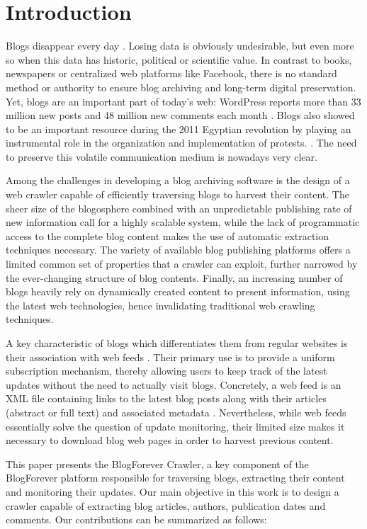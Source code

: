 \section{Introduction}

Blogs disappear every day \cite{johnson2008blogs}. Losing data is obviously undesirable, but even more so when this data has historic, political or scientific value. In contrast to books, newspapers or centralized web platforms like Facebook, there is no standard method or authority to ensure blog archiving and long-term digital preservation. Yet, blogs are an important part of today's web: WordPress reports more than 33 million new posts and 48 million new comments each month \cite{wordpress2014}. Blogs also showed to be an important resource during the 2011 Egyptian revolution by playing an instrumental role in the organization and implementation of protests. \cite{nahedeltantawy2012}. The need to preserve this volatile communication medium is nowadays very clear.

Among the challenges in developing a blog archiving software is the design of a web crawler capable of efficiently traversing blogs to harvest their content. The sheer size of the blogosphere combined with an unpredictable publishing rate of new information call for a highly scalable system, while the lack of programmatic access to the complete blog content makes the use of automatic extraction techniques necessary. The variety of available blog publishing platforms offers a limited common set of properties that a crawler can exploit, further narrowed by the ever-changing structure of blog contents. Finally, an increasing number of blogs heavily rely on dynamically created content to present information, using the latest web technologies, hence invalidating traditional web crawling techniques.

A key characteristic of blogs which differentiates them from regular websites is their association with web feeds \cite{lindahl2003weblogs}. Their primary use is to provide a uniform subscription mechanism, thereby allowing users to keep track of the latest updates without the need to actually visit blogs. Concretely, a web feed is an XML file containing links to the latest blog posts along with their articles (abstract or full text) and associated metadata \cite{board2007rss}. Nevertheless, while web feeds essentially solve the question of update monitoring, their limited size makes it necessary to download blog web pages in order to harvest previous content.

This paper presents the BlogForever Crawler, a key component of the BlogForever platform \cite{kasioumis2013towards} responsible for traversing blogs, extracting their content and monitoring their updates. Our main objective in this work is to design a crawler capable of extracting blog articles, authors, publication dates and comments. Our contributions can be summarized as follows:

